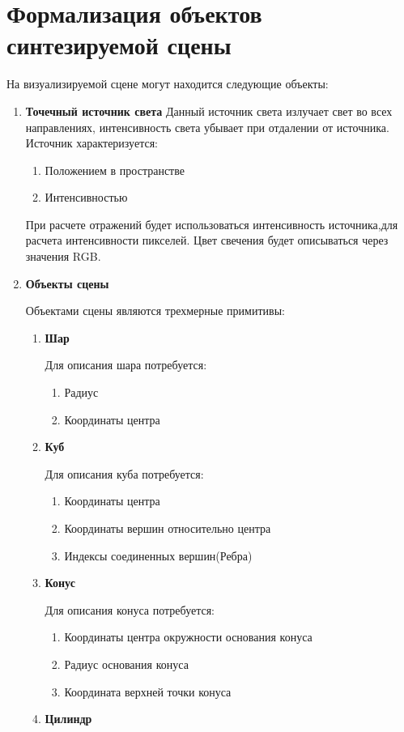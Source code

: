 \documentclass[a4paper,14pt,unknownkeysallowed]{extreport}
\begin{document}
\section[Формализация объектов синтезируемой сцены]{Формализация объектов синтезируемой сцены}
\label{sec:obj_formalasation}
На визуализируемой сцене могут находится следующие объекты:
\begin{enumerate}
	\item \textbf{Точечный источник света}
	Данный источник света излучает свет во всех направлениях, интенсивность света убывает при отдалении от источника.
	Источник характеризуется:
	\begin{enumerate}[label*=\arabic*.]
		\item Положением в пространстве
		\item Интенсивностью
	\end{enumerate}
	При расчете отражений будет использоваться интенсивность источника,для расчета интенсивности пикселей. Цвет свечения будет описываться через значения RGB.
	\item \textbf{Объекты сцены}
	
	Объектами сцены являются трехмерные примитивы:
	\begin{enumerate}[label*=\arabic*.]
		\item \textbf{Шар}
		
		Для описания шара потребуется:
		\begin{enumerate}[label*=\arabic*.]
			\item Радиус
			\item Координаты центра
		\end{enumerate}
		\item  \textbf{Куб}
		
		Для описания куба потребуется:
		\begin{enumerate}[label*=\arabic*.]
			\item Координаты центра
			\item Координаты вершин относительно центра
			\item Индексы соединенных вершин(Ребра)
		\end{enumerate}
		\item  \textbf{Конус}
		
		Для описания конуса потребуется:
		\begin{enumerate}[label*=\arabic*.]
			\item Координаты центра окружности основания конуса
			\item Радиус основания конуса
			\item Координата верхней точки конуса
		\end{enumerate}
		\item  \textbf{Цилиндр}
		

\end{enumerate}
\end{enumerate}
\end{document}
